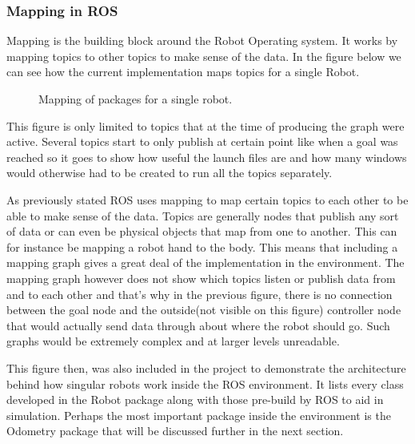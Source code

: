       \subsubsection{Mapping in ROS}
      Mapping is the building block around the Robot Operating system. It works by mapping topics to other topics to make sense of the data. In the figure below we can see how the current implementation maps topics for a single Robot.

          \begin{figure}[htp]
            \caption{Mapping of packages for a single robot.}
          \end{figure}

      This figure is only limited to topics that at the time of producing the graph were active. Several topics start to only publish at certain point like when a goal was reached so it goes to show how useful the launch files are and how many windows would otherwise had to be created to run all the topics separately.

      As previously stated ROS uses mapping to map certain topics to each other to be able to make sense of the data. Topics are generally nodes that publish any sort of data or can even be physical objects that map from one to another. This can for instance be mapping a robot hand to the body. This means that including a mapping graph gives a great deal of the implementation in the environment. The mapping graph however does not show which topics listen or publish data from and to each other and that's why in the previous figure, there is no connection between the goal node and the outside(not visible on this figure) controller node that would actually send data through about where the robot should go. Such graphs would be extremely complex and at larger levels unreadable.

      This figure then, was also included in the project to demonstrate the architecture behind how singular robots work inside the ROS environment. It lists every class developed in the Robot package along with those pre-build by ROS to aid in simulation. Perhaps the most important package inside the environment is the Odometry package that will be discussed further in the next section.

